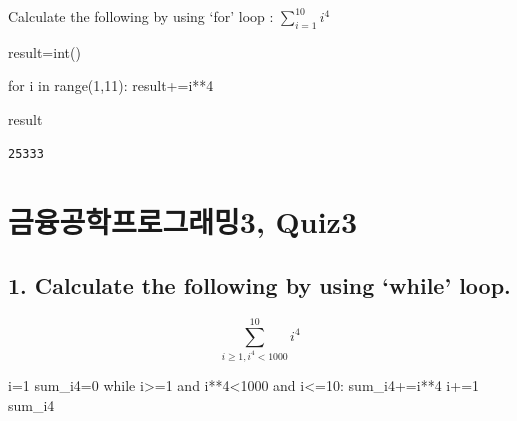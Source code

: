 \documentclass[
  a4paper,
  DIV=11,
  numbers=noendperiod]{scrreprt}
\newenvironment{Shaded}{\begin{snugshade}}{\end{snugshade}}
\newcommand{\BuiltInTok}[1]{\textcolor[rgb]{0.00,0.23,0.31}{#1}}
\newcommand{\ControlFlowTok}[1]{\textcolor[rgb]{0.00,0.23,0.31}{#1}}
\newcommand{\DecValTok}[1]{\textcolor[rgb]{0.68,0.00,0.00}{#1}}
\newcommand{\KeywordTok}[1]{\textcolor[rgb]{0.00,0.23,0.31}{#1}}
\newcommand{\NormalTok}[1]{\textcolor[rgb]{0.00,0.23,0.31}{#1}}
\newcommand{\OperatorTok}[1]{\textcolor[rgb]{0.37,0.37,0.37}{#1}}
\begin{document}
Calculate the following by using `for' loop : \(\sum_{i=1}^{10} i^4\)

\begin{Shaded}
\begin{Highlighting}[]
\NormalTok{result}\OperatorTok{=}\BuiltInTok{int}\NormalTok{()}

\ControlFlowTok{for}\NormalTok{ i }\KeywordTok{in} \BuiltInTok{range}\NormalTok{(}\DecValTok{1}\NormalTok{,}\DecValTok{11}\NormalTok{):}
\NormalTok{    result}\OperatorTok{+=}\NormalTok{i}\OperatorTok{**}\DecValTok{4}

\NormalTok{result}
\end{Highlighting}
\end{Shaded}

\begin{verbatim}
25333
\end{verbatim}

\chapter*{금융공학프로그래밍3,
Quiz3}\label{uxae08uxc735uxacf5uxd559uxd504uxb85cuxadf8uxb798uxbc0d3-quiz3}


\section*{1. Calculate the following by using `while'
loop.}\label{calculate-the-following-by-using-while-loop.}


\[\sum_{i\geq 1, i^4<1000}^{10}i^4\]

\begin{Shaded}
\begin{Highlighting}[]
\NormalTok{i}\OperatorTok{=}\DecValTok{1}
\NormalTok{sum\_i4}\OperatorTok{=}\DecValTok{0}
\ControlFlowTok{while}\NormalTok{ i}\OperatorTok{\textgreater{}=}\DecValTok{1} \KeywordTok{and}\NormalTok{ i}\OperatorTok{**}\DecValTok{4}\OperatorTok{\textless{}}\DecValTok{1000} \KeywordTok{and}\NormalTok{ i}\OperatorTok{\textless{}=}\DecValTok{10}\NormalTok{:}
\NormalTok{    sum\_i4}\OperatorTok{+=}\NormalTok{i}\OperatorTok{**}\DecValTok{4}
\NormalTok{    i}\OperatorTok{+=}\DecValTok{1}
\NormalTok{sum\_i4}
\end{Highlighting}
\end{Shaded}
\end{document}
